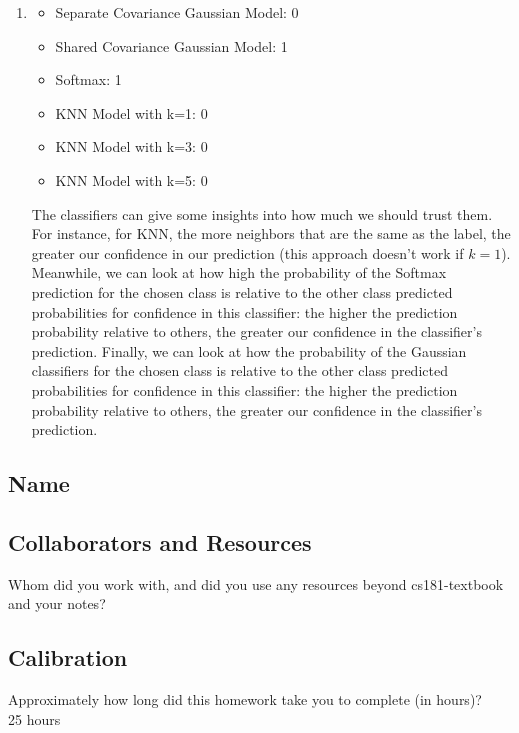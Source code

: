 \documentclass[submit]{harvardml}
\begin{document}
\begin{enumerate}
    \item 
    \begin{itemize}
        \item Separate Covariance Gaussian Model: 0 
        \item Shared Covariance Gaussian Model: 1
        \item Softmax: 1
        \item KNN Model with k=1: 0
        \item KNN Model with k=3: 0
        \item KNN Model with k=5: 0
    \end{itemize}
    The classifiers can give some insights into how much we should trust them. For instance, for KNN, the more neighbors that are the same as the label, the greater our confidence in our prediction (this approach doesn't work if $k=1$). Meanwhile, we can look at how high the probability of the Softmax prediction for the chosen class is relative to the other class predicted probabilities for confidence in this classifier: the higher the prediction probability relative to others, the greater our confidence in the classifier's prediction. Finally, we can look at how the probability of the Gaussian classifiers for the chosen class is relative to the other class predicted probabilities for confidence in this classifier: the higher the prediction probability relative to others, the greater our confidence in the classifier's prediction. 
    
\end{enumerate}

\newpage
\subsection*{Name}

\subsection*{Collaborators and Resources}
Whom did you work with, and did you use any resources beyond cs181-textbook and your notes?

\subsection*{Calibration}
Approximately how long did this homework take you to complete (in hours)? \\
25 hours
\end{document}
